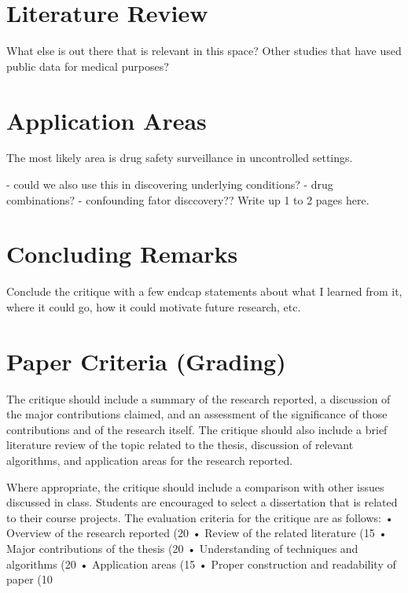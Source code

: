 \documentclass[twoside,11pt]{article}
\begin{document}
\section{Literature Review}
What else is out there that is relevant in this space?  Other studies
that have used public data for medical purposes?



\section{Application Areas}
The most likely area is drug safety surveillance in uncontrolled settings.

- could we also use this in discovering underlying conditions?
- drug combinations?
- confounding fator disccovery??
Write up 1 to 2 pages here.


\section{Concluding Remarks}
Conclude the critique with a few endcap statements about what I learned from it,
where it could go, how it could motivate future research, etc.


\newpage

\section{Paper Criteria (Grading)}
The critique should include a summary of the research reported, a discussion of the major contributions
claimed, and an assessment of the significance of those contributions and of the research itself. The
critique should also include a brief literature review of the topic related to the thesis, discussion of relevant
algorithms, and application areas for the research reported.

Where appropriate, the critique should
include a comparison with other issues discussed in class. Students are encouraged to select a
dissertation that is related to their course projects.
The evaluation criteria for the critique are as follows:
• Overview of the research reported (20%
• Review of the related literature (15%
• Major contributions of the thesis (20%
• Understanding of techniques and algorithms (20%
• Application areas (15%
• Proper construction and readability of paper (10%



\vskip 0.2in

\end{document}
